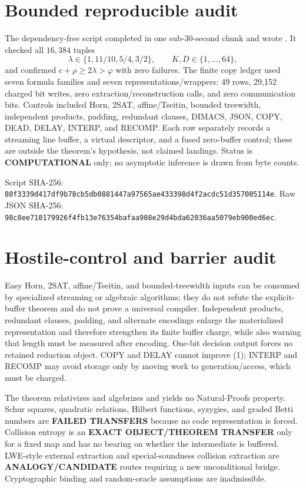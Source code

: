 \documentclass[11pt]{article}
\newcommand{\COMP}{\textbf{COMPUTATIONAL}}
\begin{document}
\section{Bounded reproducible audit}
The dependency-free script
 completed in
one sub-30-second chunk and wrote
.
It checked all $16{,}384$ tuples
\[
 \lambda\in\{1,11/10,5/4,3/2\},\qquad K,D\in\{1,\ldots,64\},
\]
and confirmed $c+\rho\ge2\lambda>\varphi$ with zero failures.  The finite
copy ledger used seven formula families and seven representations/wrappers:
49 rows, 29,152 charged bit writes, zero extraction/reconstruction calls, and
zero communication bits.  Controls included Horn, 2SAT, affine/Tseitin,
bounded treewidth, independent products, padding, redundant clauses, DIMACS,
JSON, COPY, DEAD, DELAY, INTERP, and RECOMP.  Each row separately records a
streaming line buffer, a virtual descriptor, and a fused zero-buffer control;
these are outside the theorem's hypothesis, not claimed landings.  Status is
\COMP{} only; no asymptotic inference is drawn from byte counts.

Script SHA-256:
\nolinkurl{80f3339d417df9b78cb5db0881447a97565ae433398d4f2acdc51d357005114e}.
Raw JSON SHA-256:
\nolinkurl{98c8ee710179926f4fb13e76354bafaa908e29d4bda62036aa5079eb900ed6ec}.

\section{Hostile-control and barrier audit}
Easy Horn, 2SAT, affine/Tseitin, and bounded-treewidth inputs can be consumed
by specialized streaming or algebraic algorithms; they do not refute the
explicit-buffer theorem and do not prove a universal compiler.  Independent
products, redundant clauses, padding, and alternate encodings enlarge the
materialized representation and therefore strengthen its finite buffer
charge, while also warning that length must be measured after encoding.
One-bit decision output forces no retained reduction object.  COPY and DELAY
cannot improve (1); INTERP and RECOMP may avoid storage only by moving work to
generation/access, which must be charged.

The theorem relativizes and algebrizes and yields no Natural-Proofs property.
Schur squares, quadratic relations, Hilbert functions, syzygies, and graded
Betti numbers are \textbf{FAILED TRANSFERS} because no code representation is
forced.  Collision entropy is an \textbf{EXACT OBJECT/THEOREM TRANSFER} only
for a fixed map and has no bearing on whether the intermediate is buffered.
LWE-style external extraction and special-soundness collision extraction are
\textbf{ANALOGY/CANDIDATE} routes requiring a new unconditional bridge.
Cryptographic binding and random-oracle assumptions are inadmissible.
\end{document}
